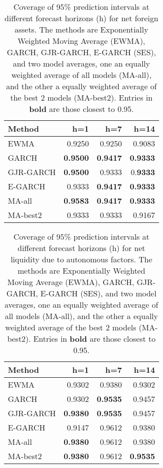 \begin{table}[!ht]
\centering
\begin{tabular}{lrrr}
  \hline
Method & h=1 & h=7 & h=14 \\ 
  \hline
EWMA & 0.9250 & 0.9250 & 0.9083 \\ 
  GARCH & \textbf{0.9500} & \textbf{0.9417} & \textbf{0.9333} \\ 
  GJR-GARCH & \textbf{0.9500} & 0.9333 & 0.\textbf{9333} \\ 
  E-GARCH & 0.9333 & \textbf{0.9417} & \textbf{0.9333} \\ 
  MA-all & \textbf{0.9583} & \textbf{0.9417} & \textbf{0.9333} \\ 
  MA-best2 & 0.9333 & 0.9333 & 0.9167 \\ 
   \hline
\end{tabular}
\caption{Coverage of 95\% prediction intervals at different forecast horizons (h) for net foreign assets. The methods are Exponentially Weighted Moving Average (EWMA), GARCH, GJR-GARCH, E-GARCH (SES), and two model averages, one an equally weighted average of all models (MA-all), and the other a equally weighted average of the best 2 models (MA-best2). Entries in \textbf{bold} are those closest to 0.95.} \label{tab:nfasum}
\end{table}

\begin{table}[!ht]
\centering
\begin{tabular}{lrrr}
  \hline
Method & h=1 & h=7 & h=14 \\ 
  \hline
EWMA & 0.9302 & 0.9380 & 0.9302 \\ 
  GARCH & 0.9302 & \textbf{0.9535} & 0.9457 \\ 
  GJR-GARCH & \textbf{0.9380 }& \textbf{0.9535} & 0.9457 \\ 
  E-GARCH & 0.9147 & 0.9612 & 0.9380 \\ 
  MA-all &\textbf{ 0.9380} & 0.9612 & 0.9380 \\ 
  MA-best2 & \textbf{0.9380} & 0.9612 & \textbf{0.9535} \\ 
   \hline
\end{tabular}
\caption{Coverage of 95\% prediction intervals at different forecast horizons (h) for net liquidity due to autonomous factors. The methods are Exponentially Weighted Moving Average (EWMA), GARCH, GJR-GARCH, E-GARCH (SES), and two model averages, one an equally weighted average of all models (MA-all), and the other a equally weighted average of the best 2 models (MA-best2). Entries in \textbf{bold} are those closest to 0.95.} \label{tab:aggsum}
\end{table}

